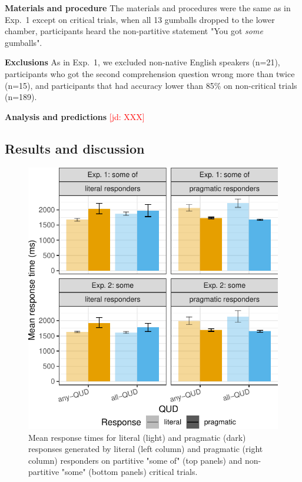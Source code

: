 \documentclass[10pt,letterpaper]{article}
\newcommand{\jd}[1]{\textcolor{Red}{[jd: #1]}}
\begin{document}
\noindent \textbf{Materials and procedure} The materials and procedures were the same as in Exp.~1 except on critical trials, when all 13 gumballs dropped to the lower chamber, participants heard the non-partitive statement "You got \textit{some} gumballs".

\noindent \textbf{Exclusions} As in Exp.~1, we excluded non-native English speakers (n=21), participants who got the second comprehension question wrong more than twice (n=15), and participants that had accuracy lower than 85\% on non-critical trials (n=189).

\noindent \textbf{Analysis and predictions}
\jd{XXX}

\subsection{Results and discussion}

\begin{figure}
\centering
  \includegraphics[width=\columnwidth]{plots/responsetimes}
  \caption{Mean response times for literal (light) and pragmatic (dark) responses generated by literal (left column) and pragmatic (right column) responders on partitive "some of" (top panels) and non-partitive "some" (bottom panels) critical trials. }
  \label{fig:responsetimes}
\end{figure}
\end{document}
